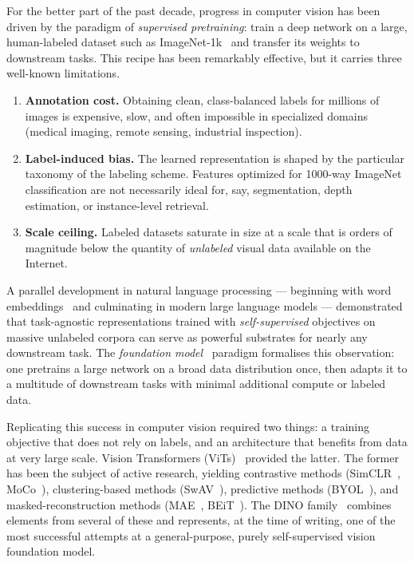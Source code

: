 \documentclass[11pt,a4paper]{article}
\begin{document}
For the better part of the past decade, progress in computer vision has been
driven by the paradigm of \emph{supervised pretraining}: train a deep network
on a large, human-labeled dataset such as ImageNet-1k~\citep{russakovsky2015imagenet}
and transfer its weights to downstream tasks. This recipe has been remarkably
effective, but it carries three well-known limitations.
\begin{enumerate}[leftmargin=*]
  \item \textbf{Annotation cost.} Obtaining clean, class-balanced labels for
  millions of images is expensive, slow, and often impossible in specialized
  domains (medical imaging, remote sensing, industrial inspection).
  \item \textbf{Label-induced bias.} The learned representation is shaped by
  the particular taxonomy of the labeling scheme. Features optimized for
  1000-way ImageNet classification are not necessarily ideal for, say,
  segmentation, depth estimation, or instance-level retrieval.
  \item \textbf{Scale ceiling.} Labeled datasets saturate in size at a scale
  that is orders of magnitude below the quantity of \emph{unlabeled} visual
  data available on the Internet.
\end{enumerate}

A parallel development in natural language processing --- beginning with word
embeddings~\citep{mikolov2013distributed} and culminating in modern large
language models --- demonstrated that task-agnostic representations trained
with \emph{self-supervised} objectives on massive unlabeled corpora can
serve as powerful substrates for nearly any downstream task. The
\emph{foundation model}~\citep{bommasani2021opportunities} paradigm
formalises this observation: one pretrains a large network on a broad data
distribution once, then adapts it to a multitude of downstream tasks with
minimal additional compute or labeled data.

Replicating this success in computer vision required two things: a training
objective that does not rely on labels, and an architecture that benefits
from data at very large scale. Vision Transformers
(ViTs)~\citep{dosovitskiy2021image} provided the latter. The former has been
the subject of active research, yielding contrastive methods
(SimCLR~\citep{chen2020simple}, MoCo~\citep{he2020momentum}),
clustering-based methods (SwAV~\citep{caron2020unsupervised}), predictive
methods (BYOL~\citep{grill2020bootstrap}), and masked-reconstruction methods
(MAE~\citep{he2022masked}, BEiT~\citep{bao2021beit}). The DINO
family~\citep{caron2021emerging, oquab2024dinov2, simeoni2025dinov3} combines
elements from several of these and represents, at the time of writing, one
of the most successful attempts at a general-purpose, purely self-supervised
vision foundation model.
\end{document}
